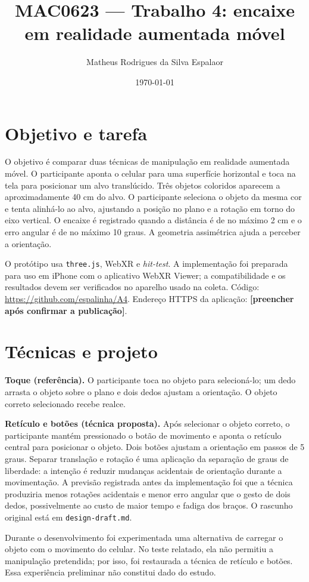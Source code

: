 \documentclass[11pt,a4paper]{article}
\title{MAC0623 --- Trabalho 4: encaixe em realidade aumentada móvel}
\author{Matheus Rodrigues da Silva Espalaor}
\date{\today}
\begin{document}
\maketitle

\section{Objetivo e tarefa}
O objetivo é comparar duas técnicas de manipulação em realidade aumentada móvel. O participante aponta o celular para uma superfície horizontal e toca na tela para posicionar um alvo translúcido. Três objetos coloridos aparecem a aproximadamente 40 cm do alvo. O participante seleciona o objeto da mesma cor e tenta alinhá-lo ao alvo, ajustando a posição no plano e a rotação em torno do eixo vertical. O encaixe é registrado quando a distância é de no máximo 2 cm e o erro angular é de no máximo 10 graus. A geometria assimétrica ajuda a perceber a orientação.

O protótipo usa \texttt{three.js}, WebXR e \textit{hit-test}. A implementação foi preparada para uso em iPhone com o aplicativo WebXR Viewer; a compatibilidade e os resultados devem ser verificados no aparelho usado na coleta. Código: \url{https://github.com/espalinha/A4}. Endereço HTTPS da aplicação: \textbf{[preencher após confirmar a publicação]}.

\section{Técnicas e projeto}
\textbf{Toque (referência).} O participante toca no objeto para selecioná-lo; um dedo arrasta o objeto sobre o plano e dois dedos ajustam a orientação. O objeto correto selecionado recebe realce.

\textbf{Retículo e botões (técnica proposta).} Após selecionar o objeto correto, o participante mantém pressionado o botão de movimento e aponta o retículo central para posicionar o objeto. Dois botões ajustam a orientação em passos de 5 graus. Separar translação e rotação é uma aplicação da separação de graus de liberdade: a intenção é reduzir mudanças acidentais de orientação durante a movimentação. A previsão registrada antes da implementação foi que a técnica produziria menos rotações acidentais e menor erro angular que o gesto de dois dedos, possivelmente ao custo de maior tempo e fadiga dos braços. O rascunho original está em \texttt{design-draft.md}.

Durante o desenvolvimento foi experimentada uma alternativa de carregar o objeto com o movimento do celular. No teste relatado, ela não permitiu a manipulação pretendida; por isso, foi restaurada a técnica de retículo e botões. Essa experiência preliminar não constitui dado do estudo.
\end{document}
